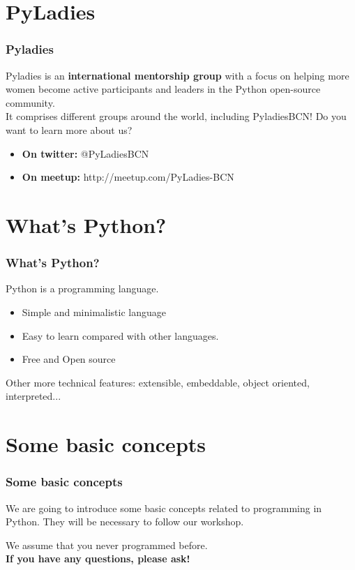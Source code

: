 \section{PyLadies}
\begin{frame}
\frametitle{Pyladies}
\vspace{1em}
Pyladies is an \textbf{international mentorship group} with a focus on helping more women become active participants and leaders in the Python open-source community.\\
\vspace{1em}
It comprises different groups around the world, including PyladiesBCN! Do you want to learn more about us?\\
\vspace{1em}
	\begin{itemize}
	    \item \textbf{On twitter:} @PyLadiesBCN
		\item \textbf{On meetup:} http://meetup.com/PyLadies-BCN
	\end{itemize}
	
\end{frame}

\section{What’s Python?}
\begin{frame}
\frametitle{What’s Python?}

\begin{center}
{\Large Python is a programming language.}
\end{center}

	\begin{itemize}
	    \item Simple and minimalistic language
		\item Easy to learn compared with other languages.
		\item Free and Open source
	\end{itemize}
\hfill \break
Other more technical features: extensible, embeddable, object oriented, interpreted...
\end{frame}

\section{Some basic concepts}
\begin{frame}
\frametitle{Some basic concepts}

{\normalsize We are going to introduce some basic concepts related to programming in Python. They will be necessary to follow our workshop.\\} 

\vspace{2em}
{\normalsize We assume that you never programmed before.\\}
\vspace{1em}
\textbf{{\Large If you have any questions, please ask!}}

\end{frame}

